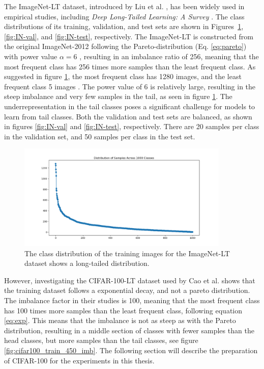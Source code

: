 The ImageNet-LT dataset, introduced by Liu et al. \cite{liu2019largescalelongtailedrecognitionopen}, has been widely used in empirical studies, including \textit{Deep Long-Tailed Learning: A Survey} \cite{zhang2023deep}. The class distributions of its training, validation, and test sets are shown in Figures~\ref{fig:IN-train}, \ref{fig:IN-val}, and \ref{fig:IN-test}, respectively. The ImageNet-LT is constructed from the original ImageNet-2012 following the Pareto-distribution (Eq. \eqref{eq:pareto}) with power value $\alpha=6$ \cite{liu2019largescalelongtailedrecognitionopen}, resulting in an imbalance ratio of 256, meaning that the most frequent class has 256 times more samples than the least frequent class. As suggested in figure \ref{fig:IN-train}, the most frequent class has 1280 images, and the least frequent class 5 images \cite{liu2019largescalelongtailedrecognitionopen}. The power value of 6 is relatively large, resulting in the steep imbalance and very few samples in the tail, as seen in figure \ref{fig:IN-train}. The underrepresentation in the tail classes poses a significant challenge for models to learn from tail classes. Both the validation and test sets are balanced, as shown in figures \ref{fig:IN-val} and \ref{fig:IN-test}, respectively. There are 20 samples per class in the validation set, and 50 samples per class in the test set. 


\begin{figure}[h!]
    \centering
    \includegraphics[width=0.9\textwidth]{Images/Plots/class_distribution_train.png}
    \caption{The class distribution of the training images for the ImageNet-LT dataset shows a long-tailed distribution.}
    \label{fig:IN-train}
\end{figure}


However, investigating the CIFAR-100-LT dataset used by Cao et al. \cite{cao2019learningimbalanceddatasetslabeldistributionaware} shows that the training dataset follows a exponential decay, and not a pareto distribution. The imbalance factor in their studies is 100, meaning that the most frequent class has 100 times more samples than the least frequent class, following equation \eqref{eq:exp}. This means that the imbalance is not as steep as with the Pareto distribution, resulting in a middle section of classes with fewer samples than the head classes, but more samples than the tail classes, see figure \ref{fig:cifar100_train_450_imb}. The following section will describe the preparation of CIFAR-100 for the experiments in this thesis.



